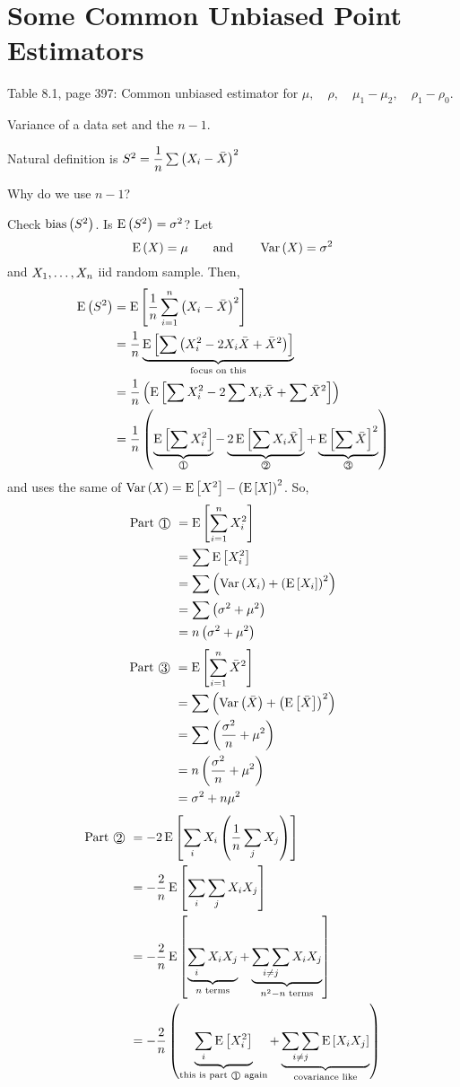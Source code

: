 \section{Some Common Unbiased Point Estimators}
Table 8.1, page 397: Common unbiased estimator for $\mu,\quad \rho,\quad \mu_1 - \mu_2,\quad \rho_1 - \rho_0$.

\example Variance of a data set and the $n-1$.

\nnl Natural definition is $S^2 = \dfrac{1}{n}\sum \pars{X_i-\Xbar}^2$

\nnl Why do we use $n-1$?

\nl Check $\bias{S^2}$. Is $\E{S^2} = \sigma^2$? Let
$$\E{X} = \mu \qquad \text{and}\qquad \Var{X} = \sigma^2$$
and ${X}_1, \dots, {X}_n$ iid random sample. Then,
\begin{align*}
    \E{S^2} &= \Eb{\over{n}\sum_{i=1}^{n} \pars{X_i - \Xbar}^2} \\
    &= \over{n}\underbrace{\Eb{\sum \pars{X_i^2 - 2X_i\Xbar + \Xbar ^2}}}_{\text{focus on this}}\\
    &= \over{n}\pars{\Eb{\sum X_i^2 - 2\sum X_i\Xbar + \sum \Xbar^2}}\\
    &= \over{n}\pars{\underbrace{\Eb{\sum X_i^2}}_{\text{\cir{1}}} - \underbrace{2\Eb{\sum X_i\Xbar}}_{\text{\cir{2}}} + \underbrace{\Eb{\sum \Xbar}^2}_{\text{\cir{3}}}} 
\end{align*}
 and  uses the same  of $\Var{X} = \Eb{X^2} - \pars{\Eb{X}}^2 $. So,
\begin{align*}
    \text{Part \cir{1} } &= \Eb{\sum_{i=1}^{n} X_i^2} \\ 
    &= \sum \Eb{X_i^2}\\
    &= \sum \pars{\Var{X_i} + \pars{\Eb{X_i}}^2}\\
    &= \sum \pars{\sigma^2 + \mu^2} \\
    &= n\pars{\sigma^2 + \mu^2}
\end{align*}
\begin{align*}
    \text{Part \cir{3} } &= \Eb{\sum_{i=1}^{n} \Xbar^2} \\
    &= \sum \pars{\Var{\Xbar} + \pars{\Eb{\Xbar}}^2}\\
    &= \sum \pars{\frac{\sigma^2}{n} + \mu^2}\\ %
    &= n \pars{\frac{\sigma^2}{n} + \mu^2} \\
    &= \sigma^2 + n \mu^2
\end{align*}
\begin{align*}
    \text{Part \cir{2} } &= -2\Eb{\sum_i X_i\pars{\over{n}\sum_j X_j}}\\
    &= -\frac{2}{n} \Eb{\sum_i \sum_j X_i X_j} \\%
    &= -\frac{2}{n} \Eb{\underbrace{\sum_i X_iX_j}_{n \text{ terms}} + \underbrace{\mathop{\sum\sum}_{i\neq j}  X_i X_j}_{n^2-n \text{ terms}}} \\
    &= -\frac{2}{n} \pars{\underbrace{\sum_i \Eb{X_i^2}}_{\text{this is part \cir{1} again}} + \underbrace{ \mathop{\sum\sum}_{i\neq j} \Eb{X_i X_j}}_{\text{covariance like}}}
\end{align*}
